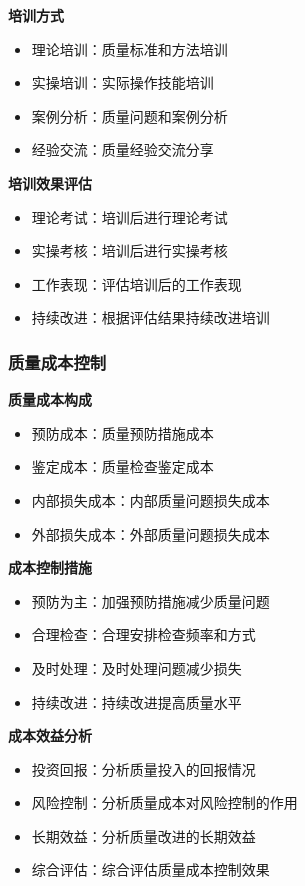 \documentclass[UTF8,a4paper,zihao=-4]{ctexart}
\begin{document}
\textbf{培训方式}
\begin{itemize}
    \item 理论培训：质量标准和方法培训
    \item 实操培训：实际操作技能培训
    \item 案例分析：质量问题和案例分析
    \item 经验交流：质量经验交流分享
\end{itemize}

\textbf{培训效果评估}
\begin{itemize}
    \item 理论考试：培训后进行理论考试
    \item 实操考核：培训后进行实操考核
    \item 工作表现：评估培训后的工作表现
    \item 持续改进：根据评估结果持续改进培训
\end{itemize}

\subsubsection{质量成本控制}
\textbf{质量成本构成}
\begin{itemize}
    \item 预防成本：质量预防措施成本
    \item 鉴定成本：质量检查鉴定成本
    \item 内部损失成本：内部质量问题损失成本
    \item 外部损失成本：外部质量问题损失成本
\end{itemize}

\textbf{成本控制措施}
\begin{itemize}
    \item 预防为主：加强预防措施减少质量问题
    \item 合理检查：合理安排检查频率和方式
    \item 及时处理：及时处理问题减少损失
    \item 持续改进：持续改进提高质量水平
\end{itemize}

\textbf{成本效益分析}
\begin{itemize}
    \item 投资回报：分析质量投入的回报情况
    \item 风险控制：分析质量成本对风险控制的作用
    \item 长期效益：分析质量改进的长期效益
    \item 综合评估：综合评估质量成本控制效果
\end{itemize}
\end{document}
